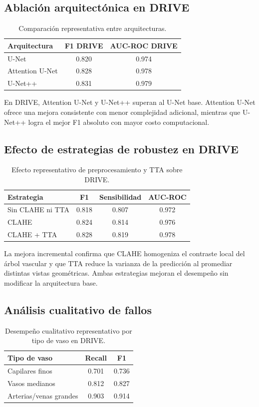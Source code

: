 \subsection{Ablación arquitectónica en DRIVE}
\begin{table}[h]
\centering
\caption{Comparación representativa entre arquitecturas.}
\label{tab:arch-ablation}
\begin{tabular}{lcc}
\toprule
Arquitectura & F1 DRIVE & AUC-ROC DRIVE \\
\midrule
U-Net & 0.820 & 0.974 \\
Attention U-Net & 0.828 & 0.978 \\
U-Net++ & 0.831 & 0.979 \\
\bottomrule
\end{tabular}
\end{table}

En DRIVE, Attention U-Net y U-Net++ superan al U-Net base. Attention U-Net ofrece una mejora consistente con menor complejidad adicional, mientras que U-Net++ logra el mejor F1 absoluto con mayor costo computacional.

\subsection{Efecto de estrategias de robustez en DRIVE}
\begin{table}[h]
\centering
\caption{Efecto representativo de preprocesamiento y TTA sobre DRIVE.}
\label{tab:domain-adaptation}
\begin{tabular}{lccc}
\toprule
Estrategia & F1 & Sensibilidad & AUC-ROC \\
\midrule
Sin CLAHE ni TTA & 0.818 & 0.807 & 0.972 \\
CLAHE & 0.824 & 0.814 & 0.976 \\
CLAHE + TTA & 0.828 & 0.819 & 0.978 \\
\bottomrule
\end{tabular}
\end{table}

La mejora incremental confirma que CLAHE homogeniza el contraste local del árbol vascular y que TTA reduce la varianza de la predicción al promediar distintas vistas geométricas. Ambas estrategias mejoran el desempeño sin modificar la arquitectura base.

\subsection{Análisis cualitativo de fallos}
\begin{table}[h]
\centering
\caption{Desempeño cualitativo representativo por tipo de vaso en DRIVE.}
\label{tab:vessel-types}
\begin{tabular}{lcc}
\toprule
Tipo de vaso & Recall & F1 \\
\midrule
Capilares finos & 0.701 & 0.736 \\
Vasos medianos & 0.812 & 0.827 \\
Arterias/venas grandes & 0.903 & 0.914 \\
\bottomrule
\end{tabular}
\end{table}

